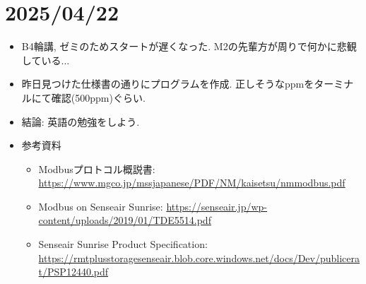 \documentclass[11pt,a4paper,uplatex]{jsarticle}
\begin{document}
\section{2025/04/22}
\begin{itemize}
    \item B4輪講, ゼミのためスタートが遅くなった. M2の先輩方が周りで何かに悲観している$\dots$
    \item 昨日見つけた仕様書の通りにプログラムを作成. 正しそうなppmをターミナルにて確認(500ppm)ぐらい.
    \item 結論: 英語の勉強をしよう.
    \item 参考資料
    \begin{itemize}
        \item Modbusプロトコル概説書: \url{https://www.mgco.jp/mssjapanese/PDF/NM/kaisetsu/nmmodbus.pdf}
        \item Modbus on Senseair Sunrise: \url{https://senseair.jp/wp-content/uploads/2019/01/TDE5514.pdf}
        \item Senseair Sunrise Product Specification: \url{https://rmtplusstoragesenseair.blob.core.windows.net/docs/Dev/publicerat/PSP12440.pdf}
    \end{itemize}
\end{itemize}
\end{document}
